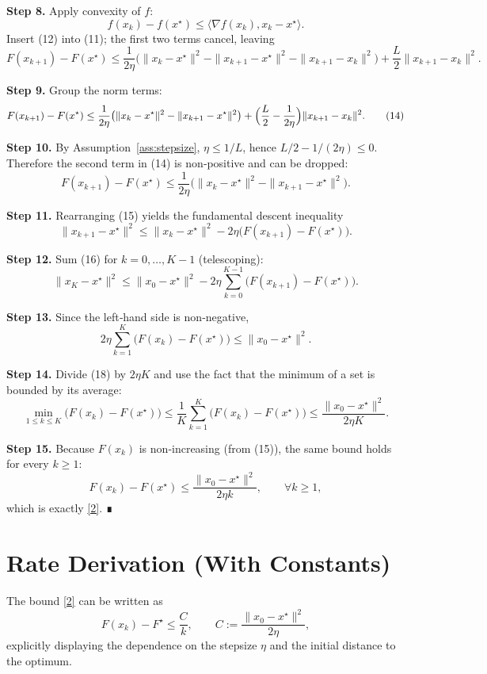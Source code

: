 \documentclass{article}
\begin{document}
\noindent\textbf{Step 8.} Apply convexity of $f$:
\[
f(x_{k})-f(x^{\star})\le\langle \nabla f(x_{k}),x_{k}-x^{\star}\rangle .
\tag{12}
\]
Insert (12) into (11); the first two terms cancel, leaving
\[
F(x_{k+1})-F(x^{\star})
\le \frac{1}{2\eta}\bigl(\|x_{k}-x^{\star}\|^{2}
                     -\|x_{k+1}-x^{\star}\|^{2}
                     -\|x_{k+1}-x_{k}\|^{2}\bigr)
   +\frac{L}{2}\|x_{k+1}-x_{k}\|^{2}.
\tag{13}
\]

\noindent\textbf{Step 9.} Group the norm terms:
\[
F(x_{k+1})-F(x^{\star})
\le \frac{1}{2\eta}\bigl(\|x_{k}-x^{\star}\|^{2}
                     -\|x_{k+1}-x^{\star}\|^{2}\bigr)
   +\Bigl(\frac{L}{2}-\frac{1}{2\eta}\Bigr)\|x_{k+1}-x_{k}\|^{2}.
\tag{14}
\]

\noindent\textbf{Step 10.} By Assumption~\ref{ass:stepsize}, $\eta\le 1/L$, hence $L/2-1/(2\eta)\le0$. Therefore the second term in (14) is non‑positive and can be dropped:
\[
F(x_{k+1})-F(x^{\star})
\le \frac{1}{2\eta}\bigl(\|x_{k}-x^{\star}\|^{2}
                     -\|x_{k+1}-x^{\star}\|^{2}\bigr).
\tag{15}
\]

\noindent\textbf{Step 11.} Rearranging (15) yields the fundamental descent inequality
\[
\|x_{k+1}-x^{\star}\|^{2}
\le \|x_{k}-x^{\star}\|^{2}
      -2\eta\bigl(F(x_{k+1})-F(x^{\star})\bigr).
\tag{16}
\]

\noindent\textbf{Step 12.} Sum (16) for $k=0,\dots, K-1$ (telescoping):
\[
\|x_{K}-x^{\star}\|^{2}
\le \|x_{0}-x^{\star}\|^{2}
      -2\eta\sum_{k=0}^{K-1}\bigl(F(x_{k+1})-F(x^{\star})\bigr).
\tag{17}
\]

\noindent\textbf{Step 13.} Since the left‑hand side is non‑negative,
\[
2\eta\sum_{k=1}^{K}\bigl(F(x_{k})-F(x^{\star})\bigr)
\le \|x_{0}-x^{\star}\|^{2}.
\tag{18}
\]

\noindent\textbf{Step 14.} Divide (18) by $2\eta K$ and use the fact that the minimum of a set is bounded by its average:
\[
\min_{1\le k\le K}\bigl(F(x_{k})-F(x^{\star})\bigr)
\le \frac{1}{K}\sum_{k=1}^{K}\bigl(F(x_{k})-F(x^{\star})\bigr)
\le \frac{\|x_{0}-x^{\star}\|^{2}}{2\eta K}.
\tag{19}
\]

\noindent\textbf{Step 15.} Because $F(x_{k})$ is non‑increasing (from (15)), the same bound holds for every $k\ge1$:
\[
F(x_{k})-F(x^{\star})\le\frac{\|x_{0}-x^{\star}\|^{2}}{2\eta k},
\qquad\forall k\ge1,
\]
which is exactly \eqref{2}. ∎

\section*{Rate Derivation (With Constants)}
The bound \eqref{2} can be written as
\[
F(x_{k})-F^{\star}\le \frac{C}{k},
\qquad C:=\frac{\|x_{0}-x^{\star}\|^{2}}{2\eta},
\]
explicitly displaying the dependence on the stepsize $\eta$ and the initial distance to the optimum.
\end{document}
